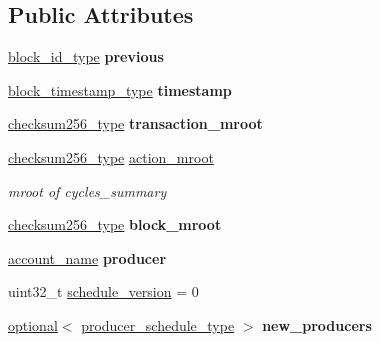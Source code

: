 \subsection*{Public Attributes}
\begin{DoxyCompactItemize}
\item 
\mbox{\label{structaacio_1_1chain_1_1block__header_ab7023162833956e6fea420e8cc07dc44}} 
\mbox{\hyperlink{classfc_1_1sha256}{block\+\_\+id\+\_\+type}} {\bfseries previous}
\item 
\mbox{\label{structaacio_1_1chain_1_1block__header_a2fc29d74ec53ccd92ace1c13e8e55501}} 
\mbox{\hyperlink{classaacio_1_1chain_1_1block__timestamp}{block\+\_\+timestamp\+\_\+type}} {\bfseries timestamp}
\item 
\mbox{\label{structaacio_1_1chain_1_1block__header_a604daf9d9e7fef6e52752fb5f8631c00}} 
\mbox{\hyperlink{classfc_1_1sha256}{checksum256\+\_\+type}} {\bfseries transaction\+\_\+mroot}
\item 
\mbox{\label{structaacio_1_1chain_1_1block__header_a1dab4060db389468cc8beecbcb9cf494}} 
\mbox{\hyperlink{classfc_1_1sha256}{checksum256\+\_\+type}} \mbox{\hyperlink{structaacio_1_1chain_1_1block__header_a1dab4060db389468cc8beecbcb9cf494}{action\+\_\+mroot}}
\begin{DoxyCompactList}\small\item\em mroot of cycles\+\_\+summary \end{DoxyCompactList}\item 
\mbox{\label{structaacio_1_1chain_1_1block__header_a2052f21035120dae59737546ead4095e}} 
\mbox{\hyperlink{classfc_1_1sha256}{checksum256\+\_\+type}} {\bfseries block\+\_\+mroot}
\item 
\mbox{\label{structaacio_1_1chain_1_1block__header_a19cc933fa52cb7018e94183bb32ffff3}} 
\mbox{\hyperlink{structaacio_1_1chain_1_1name}{account\+\_\+name}} {\bfseries producer}
\item 
uint32\+\_\+t \mbox{\hyperlink{structaacio_1_1chain_1_1block__header_a46ae9f2aef0525817b975e5d4a175026}{schedule\+\_\+version}} = 0
\item 
\mbox{\label{structaacio_1_1chain_1_1block__header_a72369344e7c2e8b9852978cb5fa59152}} 
\mbox{\hyperlink{classfc_1_1optional}{optional}}$<$ \mbox{\hyperlink{structaacio_1_1chain_1_1producer__schedule__type}{producer\+\_\+schedule\+\_\+type}} $>$ {\bfseries new\+\_\+producers}
\end{DoxyCompactItemize}


